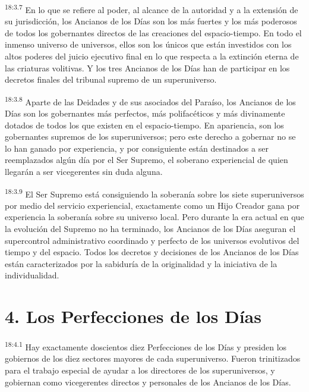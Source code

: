 \par
\textsuperscript{18:3.7} En lo que se refiere al poder, al alcance de la autoridad y a la extensión de su jurisdicción, los Ancianos de los Días son los más fuertes y los más poderosos de todos los gobernantes directos de las creaciones del espacio-tiempo. En todo el inmenso universo de universos, ellos son los únicos que están investidos con los altos poderes del juicio ejecutivo final en lo que respecta a la extinción eterna de las criaturas volitivas. Y los tres Ancianos de los Días han de participar en los decretos finales del tribunal supremo de un superuniverso.

\par
\textsuperscript{18:3.8} Aparte de las Deidades y de sus asociados del Paraíso, los Ancianos de los Días son los gobernantes más perfectos, más polifacéticos y más divinamente dotados de todos los que existen en el espacio-tiempo. En apariencia, son los gobernantes supremos de los superuniversos; pero este derecho a gobernar no se lo han ganado por experiencia, y por consiguiente están destinados a ser reemplazados algún día por el Ser Supremo, el soberano experiencial de quien llegarán a ser vicegerentes sin duda alguna.

\par
\textsuperscript{18:3.9} El Ser Supremo está consiguiendo la soberanía sobre los siete superuniversos por medio del servicio experiencial, exactamente como un Hijo Creador gana por experiencia la soberanía sobre su universo local. Pero durante la era actual en que la evolución del Supremo no ha terminado, los Ancianos de los Días aseguran el supercontrol administrativo coordinado y perfecto de los universos evolutivos del tiempo y del espacio. Todos los decretos y decisiones de los Ancianos de los Días están caracterizados por la sabiduría de la originalidad y la iniciativa de la individualidad.

\section*{4. Los Perfecciones de los Días}
\par
\textsuperscript{18:4.1} Hay exactamente doscientos diez Perfecciones de los Días y presiden los gobiernos de los diez sectores mayores de cada superuniverso. Fueron trinitizados para el trabajo especial de ayudar a los directores de los superuniversos, y gobiernan como vicegerentes directos y personales de los Ancianos de los Días.

